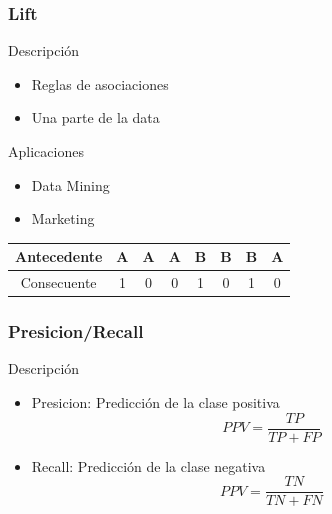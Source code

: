 \documentclass{beamer}
\begin{document}
  	
\begin{frame}
  \frametitle{Lift}

  \begin{block}{Descripci\'on}
  	\begin{itemize}

  	\item Reglas de asociaciones
  	\item Una parte de la data
   
  \end{itemize}
  \end{block}
  \begin{block}{Aplicaciones}

  	\begin{itemize}

  	\item Data Mining
  	\item Marketing
 
  \end{itemize}
  \begin{tabular}{|c|c|c|c|c|c|c|c|}
  \hline 
  Antecedente & A & A & A & B & B & B & A \\ 
  \hline 
  Consecuente & 1 & 0 & 0 & 1 & 0 & 1 & 0 \\ 
  \hline 
  \end{tabular} 
  \end{block}
  
\end{frame}

\begin{frame}
  \frametitle{Presicion/Recall}

  \begin{block}{Descripci\'on}
  	\begin{itemize}

  	\item Presicion: Predicci\'on de la clase positiva 
  	\[PPV= \dfrac{TP}{TP+FP} \] 
  	\item Recall: Predicci\'on de la clase negativa
	\[PPV= \dfrac{TN}{TN+FN} \]   
	
  \end{itemize}
  
  \end{block}
 
\end{frame}
\end{document}
